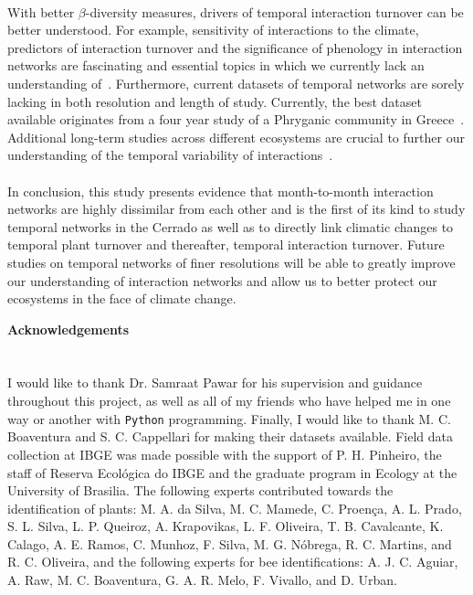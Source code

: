 \documentclass[11pt]{article}
\begin{document}
\\
With better $\beta$-diversity measures, drivers of temporal interaction turnover can be better understood. For example, sensitivity of interactions to the climate, predictors of interaction turnover and the significance of phenology in interaction networks are fascinating and essential topics in which we currently lack an understanding of~\citep{Poisot2012}. Furthermore, current datasets of temporal networks are sorely lacking in both resolution and length of study. Currently, the best dataset available originates from a four year study of a Phryganic community in Greece~\citep{Petanidou1991}. Additional long-term studies across different ecosystems are crucial to further our understanding of the temporal variability of interactions~\citep{Burkle2011}.\\
\\
In conclusion, this study presents evidence that month-to-month interaction networks are highly dissimilar from each other and is the first of its kind to study temporal networks in the Cerrado as well as to directly link climatic changes to temporal plant turnover and thereafter, temporal interaction turnover. Future studies on temporal networks of finer resolutions will be able to greatly improve our understanding of interaction networks and allow us to better protect our ecosystems in the face of climate change.

\newpage 
\vspace*{\fill}

{\huge\bfseries Acknowledgements} 
\label{sec: acknowledgements} \\
\\
\\
\large{I would like to thank Dr. Samraat Pawar for his supervision and guidance throughout this project, as well as  all of my friends who have helped me in one way or another with \texttt{Python} programming. Finally, I would like to thank M. C. Boaventura and S. C. Cappellari for making their datasets available. Field data collection at IBGE was made possible with the support of P. H. Pinheiro, the staff of Reserva Ecol\'{o}gica do IBGE and the graduate program in Ecology at the University of Brasilia. The following experts contributed towards the identification of plants: M. A. da Silva, M. C. Mamede, C. Proen\c{c}a, A. L. Prado, S. L. Silva, L. P. Queiroz, A. Krapovikas, L. F. Oliveira, T. B. Cavalcante, K. Calago, A. E. Ramos, C. Munhoz, F. Silva, M. G. N\'{o}brega, R. C. Martins, and R. C. Oliveira, and the following experts for bee identifications: A. J. C. Aguiar, A. Raw, M. C. Boaventura, G. A. R. Melo, F. Vivallo, and D. Urban.}
\vfill
\end{document}
